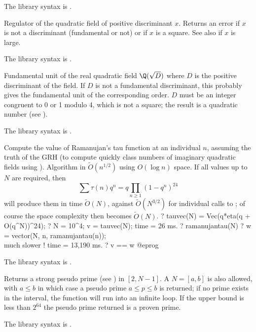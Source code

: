 The library syntax is .

\label{se:quadregulator}
Regulator of the quadratic field of positive discriminant $x$. Returns
an error if $x$ is not a discriminant (fundamental or not) or if $x$ is a
square. See also  if $x$ is large.

The library syntax is .

\label{se:quadunit}
Fundamental unit of the
real quadratic field $\Q(\sqrt D)$ where  $D$ is the positive discriminant
of the field. If $D$ is not a fundamental discriminant, this probably gives
the fundamental unit of the corresponding order. $D$ must be an integer
congruent to 0 or 1 modulo 4, which is not a square; the result is a
quadratic number (see ).

The library syntax is .

\label{se:ramanujantau}
Compute the value of Ramanujan's tau function at an individual $n$,
assuming the truth of the GRH (to compute quickly class numbers of imaginary
quadratic fields using ).
Algorithm in $\tilde{O}(n^{1/2})$ using $O(\log n)$ space. If all values up
to $N$ are required, then
$$\sum \tau(n)q^n = q \prod_{n\geq 1} (1-q^n)^{24}$$
will produce them in time $\tilde{O}(N)$, against $\tilde{O}(N^{3/2})$ for
individual calls to ; of course the space complexity then
becomes $\tilde{O}(N)$.
\bprog
? tauvec(N) = Vec(q*eta(q + O(q^N))^24);
? N = 10^4; v = tauvec(N);
time = 26 ms.
? ramanujantau(N)
? w = vector(N, n, ramanujantau(n)); \\ much slower !
time = 13,190 ms.
? v == w
@eprog

The library syntax is .

\label{se:randomprime}
Returns a strong pseudo prime (see ) in $[2,N-1]$.
A  $N = [a,b]$ is also allowed, with $a \leq b$ in which case a
pseudo prime $a \leq p \leq b$ is returned; if no prime exists in the
interval, the function will run into an infinite loop. If the upper bound
is less than $2^{64}$ the pseudo prime returned is a proven prime.

The library syntax is .

